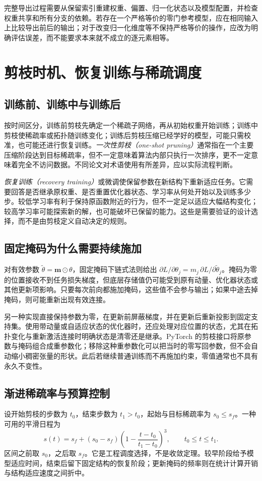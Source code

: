 \documentclass[UTF8,12pt,a4paper,fontset=fandol]{ctexart}
\begin{document}
完整导出过程需要从保留索引重建权重、偏置、归一化状态以及模型配置，并检查权重共享和所有分支的依赖。若存在一个严格等价的零门参考模型，应在相同输入上比较导出前后的输出；对于改变归一化维度等不保持严格等价的操作，应改为明确评估误差，而不能要求本来就不成立的逐元素相等。

\section{剪枝时机、恢复训练与稀疏调度}
\label{sec:prune-training}

\subsection{训练前、训练中与训练后}
按时间区分，训练前剪枝先确定一个稀疏子网络，再从初始权重开始训练；训练中剪枝使稀疏率或拓扑随训练变化；训练后剪枝压缩已经学好的模型，可能只需校准，也可能还进行恢复训练。\emph{一次性剪枝（one-shot pruning）}通常指在一个主要压缩阶段达到目标稀疏率，但不一定意味着算法内部只执行一次排序，更不一定意味着完全不访问数据。不同论文对术语使用有所差异，应以实际流程判断。

\emph{恢复训练（recovery training）}或微调使保留参数在新结构下重新适应任务。它需要回答是否继承原权重、是否重置优化器状态、学习率从何处开始以及训练多少步。较低学习率有利于保持原函数附近的行为，但不一定足以适应大幅结构变化；较高学习率可能探索新的解，也可能破坏已保留的能力。这些是需要验证的设计选择，而不是由剪枝定义自动决定的规则。

\subsection{固定掩码为什么需要持续施加}
对有效参数 $\widetilde\theta=\mathbf m\odot\theta$，固定掩码下链式法则给出 $\partial L/\partial\theta_j=m_j\,\partial L/\partial\widetilde\theta_j$。掩码为零的位置接收不到任务损失梯度，但底层存储值仍可能受到原有动量、优化器状态或其他更新项影响。只要每次前向都施加掩码，这些值不会参与输出；如果中途去掉掩码，则可能重新出现有效连接。

另一种实现直接保持参数为零，在更新前屏蔽梯度，并在更新后重新投影到固定支持集。使用带动量或自适应状态的优化器时，还应处理对应位置的状态，尤其在拓扑变化与重新激活连接时明确状态是清零还是继承。PyTorch 的剪枝接口将原参数与掩码组合成重参数化；移除这种重参数化可以把当时的零写回参数，但不会自动缩小稠密张量的形状\cite{pytorchprune}。此后若继续普通训练而不再施加约束，零值通常也不具有永久不变性。

\subsection{渐进稀疏率与预算控制}
设开始剪枝的步数为 $t_0$，结束步数为 $t_1>t_0$，起始与目标稀疏率为 $s_0\leq s_f$。一种可用的平滑日程为
\begin{equation}
 s(t)=s_f+(s_0-s_f)
 \left(1-\frac{t-t_0}{t_1-t_0}\right)^3,
 \qquad t_0\leq t\leq t_1.
 \label{eq:prune-schedule}
\end{equation}
区间之前取 $s_0$，之后取 $s_f$。它是工程调度选择，不是收敛定理。较早阶段给予模型适应时间，结束后留下固定结构的恢复阶段；更新掩码的频率则在统计计算开销与结构适应速度之间折中。
\end{document}
